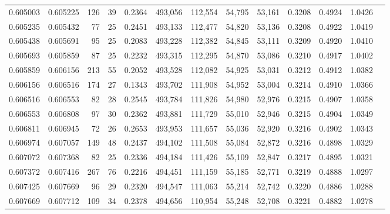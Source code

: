 \begin{tabular}{rrrrrrrrrrrrr}
0.605003 & 0.605225 &   126 &  39 &                                     0.2364 & 493,056 & 112,554 &  54,795 &  53,161 & 0.3208 & 0.4924 & 1.0426 \\
0.605235 & 0.605432 &    77 &  25 &                                     0.2451 & 493,133 & 112,477 &  54,820 &  53,136 & 0.3208 & 0.4922 & 1.0419 \\
0.605438 & 0.605691 &    95 &  25 &                                     0.2083 & 493,228 & 112,382 &  54,845 &  53,111 & 0.3209 & 0.4920 & 1.0410 \\
0.605693 & 0.605859 &    87 &  25 &                                     0.2232 & 493,315 & 112,295 &  54,870 &  53,086 & 0.3210 & 0.4917 & 1.0402 \\
0.605859 & 0.606156 &   213 &  55 &                                     0.2052 & 493,528 & 112,082 &  54,925 &  53,031 & 0.3212 & 0.4912 & 1.0382 \\
0.606156 & 0.606516 &   174 &  27 &                                     0.1343 & 493,702 & 111,908 &  54,952 &  53,004 & 0.3214 & 0.4910 & 1.0366 \\
0.606516 & 0.606553 &    82 &  28 &                                     0.2545 & 493,784 & 111,826 &  54,980 &  52,976 & 0.3215 & 0.4907 & 1.0358 \\
0.606553 & 0.606808 &    97 &  30 &                                     0.2362 & 493,881 & 111,729 &  55,010 &  52,946 & 0.3215 & 0.4904 & 1.0349 \\
0.606811 & 0.606945 &    72 &  26 &                                     0.2653 & 493,953 & 111,657 &  55,036 &  52,920 & 0.3216 & 0.4902 & 1.0343 \\
0.606974 & 0.607057 &   149 &  48 &                                     0.2437 & 494,102 & 111,508 &  55,084 &  52,872 & 0.3216 & 0.4898 & 1.0329 \\
0.607072 & 0.607368 &    82 &  25 &                                     0.2336 & 494,184 & 111,426 &  55,109 &  52,847 & 0.3217 & 0.4895 & 1.0321 \\
0.607372 & 0.607416 &   267 &  76 &                                     0.2216 & 494,451 & 111,159 &  55,185 &  52,771 & 0.3219 & 0.4888 & 1.0297 \\
0.607425 & 0.607669 &    96 &  29 &                                     0.2320 & 494,547 & 111,063 &  55,214 &  52,742 & 0.3220 & 0.4886 & 1.0288 \\
0.607669 & 0.607712 &   109 &  34 &                                     0.2378 & 494,656 & 110,954 &  55,248 &  52,708 & 0.3221 & 0.4882 & 1.0278 \\

\end{tabular}
